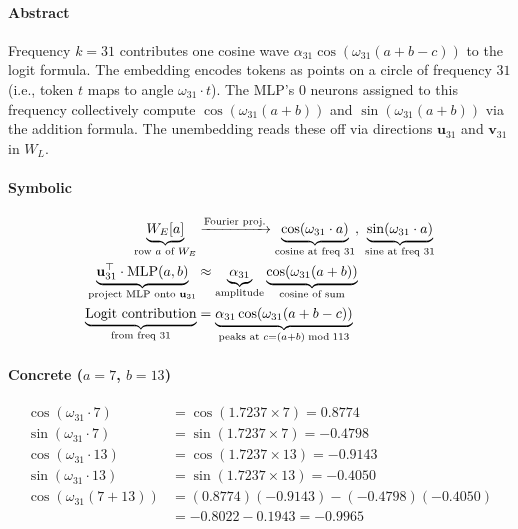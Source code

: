 \documentclass[11pt,a4paper]{article}
\begin{document}
\paragraph{Abstract}
Frequency $k = 31$ contributes one cosine wave $\alpha_{31} \cos(\omega_{31}(a+b-c))$ to the logit formula. The embedding encodes tokens as points on a circle of frequency $31$ (i.e., token $t$ maps to angle $\omega_{31} \cdot t$). The MLP's 0 neurons assigned to this frequency collectively compute $\cos(\omega_{31}(a+b))$ and $\sin(\omega_{31}(a+b))$ via the addition formula. The unembedding reads these off via directions $\mathbf{u}_{31}$ and $\mathbf{v}_{31}$ in $W_L$.

\paragraph{Symbolic}
\begin{align}
    \underbrace{W_E[a]}_{\text{row } a \text{ of } W_E} &\xrightarrow{\text{Fourier proj.}} \underbrace{\cos\!\left(\omega_{31} \cdot a\right)}_{\text{cosine at freq } 31},\;\underbrace{\sin\!\left(\omega_{31} \cdot a\right)}_{\text{sine at freq } 31}    \notag \\
    \underbrace{\mathbf{u}_{31}^\top \cdot \text{MLP}(a,b)}_{\text{project MLP onto } \mathbf{u}_{31}} &\approx \underbrace{\alpha_{31}}_{\text{amplitude}} \underbrace{\cos(\omega_{31}(a+b))}_{\text{cosine of sum}}    \notag \\
    \underbrace{\text{Logit contribution}}_{\text{from freq } 31} &= \underbrace{\alpha_{31} \cos(\omega_{31}(a+b-c))}_{\text{peaks at } c = (a+b) \bmod 113}    \notag
\end{align}

\paragraph{Concrete ($a = 7$, $b = 13$)}

\begin{align*}
    \cos(\omega_{31} \cdot 7) &= \cos(1.7237 \times 7) = 0.8774 \\
    \sin(\omega_{31} \cdot 7) &= \sin(1.7237 \times 7) = -0.4798 \\
    \cos(\omega_{31} \cdot 13) &= \cos(1.7237 \times 13) = -0.9143 \\
    \sin(\omega_{31} \cdot 13) &= \sin(1.7237 \times 13) = -0.4050 \\
    \cos(\omega_{31}(7+13)) &= (0.8774)(-0.9143) - (-0.4798)(-0.4050) \\
    &= -0.8022 - 0.1943 = -0.9965 \\
\end{align*}
\end{document}
